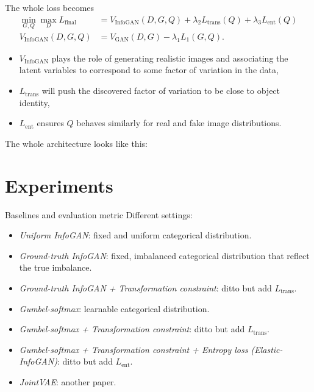 \documentclass[xcolor={svgnames}]{beamer}
\begin{document}

\begin{frame}
  The whole loss becomes
  \[
    \begin{split}
      \min_{G, Q}\max_D L_{\text{final}} &= V_{\text{InfoGAN}}(D, G, Q) + 
      \lambda_2 L_{\text{trans}}(Q) + \lambda_3 L_{\text{ent}}(Q) \\
      V_{\text{InfoGAN}}(D, G, Q) &= 
      V_{\text{GAN}}(D,G) - \lambda_1 L_1(G,Q).
    \end{split}
  \]
  
  \begin{itemize}
    \item $V_{\text{InfoGAN}}$ plays the role of generating realistic images 
      and associating the latent variables to correspond to some factor of 
      variation in the data, 
    \item $L_{\text{trans}}$ will push the discovered factor of variation to 
      be close to object identity,
    \item $L_{\text{ent}}$ ensures $Q$ behaves similarly for real and fake 
      image distributions.
  \end{itemize}
\end{frame}


\begin{frame}
  The whole architecture looks like this:
\end{frame}


\section{Experiments}
\begin{frame}{Baselines and evaluation metric}
  Different settings:
  \begin{itemize}
    \item \emph{Uniform InfoGAN}: fixed and uniform categorical distribution.
    \item \emph{Ground-truth InfoGAN}: fixed, imbalanced categorical 
      distribution that reflect the true imbalance.
    \item \emph{Ground-truth InfoGAN + Transformation constraint}: ditto but
      add $L_{\text{trans}}$.
    \item \emph{Gumbel-softmax}: learnable categorical distribution.
    \item \emph{Gumbel-softmax + Transformation constraint}: ditto but add 
      $L_{\text{trans}}$.
    \item \emph{Gumbel-softmax + Transformation constraint + Entropy loss 
      (Elastic-InfoGAN)}: ditto but add $L_{\text{ent}}$.
    \item \emph{JointVAE}: another paper.
  \end{itemize}
\end{frame}
\end{document}
